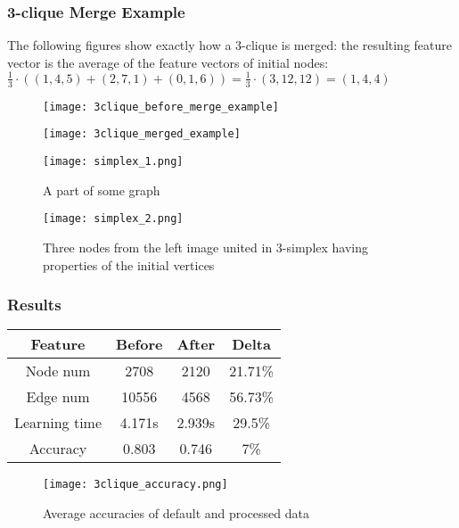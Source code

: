 \begin{frame}[allowframebreaks]
	\frametitle{3-clique Merge Example}

	The following figures show exactly how a 3-clique is merged: the resulting feature vector is the average of the feature vectors of initial nodes: $\frac{1}{3} \cdot \left( (1, 4, 5) + (2, 7, 1) + (0, 1, 6) \right) = \frac{1}{3} \cdot (3, 12, 12) = (1, 4, 4)$

	\begin{figure}[h]
		\begin{minipage}{.7\textwidth}
			\centering
			\texttt{[image: 3clique\_before\_merge\_example]}
		\end{minipage}%
		\begin{minipage}{.3\textwidth}
			\centering
			\texttt{[image: 3clique\_merged\_example]}
		\end{minipage}
	\end{figure}

	\framebreak

	\begin{figure}[h]
		\begin{multicols}{2}
			\centering
			\texttt{[image: simplex\_1.png]}
			\caption{A part of some graph}\label{fig:clique_merged}

			\centering
			\texttt{[image: simplex\_2.png]}
			\caption{Three nodes from the left image united in 3-simplex having properties of the initial vertices}
		\end{multicols}
	\end{figure}
\end{frame}

\begin{frame}[allowframebreaks, c]
	\frametitle{Results}

	\centering
	\begin{tabular}{ |c|c|c|c| }
		\hline
		Feature       & Before & After  & Delta   \\
		\hline
		Node num      & 2708   & 2120   & 21.71\% \\
		Edge num      & 10556  & 4568   & 56.73\% \\
		Learning time & 4.171s & 2.939s & 29.5\%  \\
		Accuracy      & 0.803  & 0.746  & 7\%     \\
		\hline
	\end{tabular}

	\framebreak
	
	\begin{figure}[h]
		\centering
		\texttt{[image: 3clique\_accuracy.png]}
		\caption{Average accuracies of default and processed data}
	\end{figure}
\end{frame}

